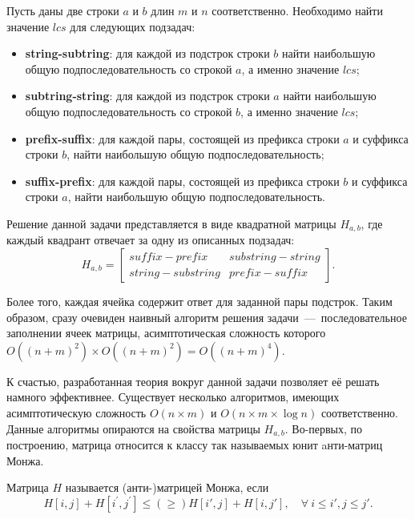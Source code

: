 \begin{definition}
Пусть даны две строки $a$ и $b$ длин $m$ и $n$ соответственно. 
Необходимо найти значение $lcs$ для следующих подзадач:
\begin{itemize}
\item \textbf{string-subtring}: для каждой из подстрок строки $b$ найти наибольшую общую подпоследовательность со строкой $a$, а именно значение $lcs$;
\item \textbf{subtring-string}: для каждой из подстрок строки $a$ найти наибольшую общую подпоследовательность со строкой $b$, а именно значение $lcs$;
\item \textbf{prefix-suffix}: для каждой пары, состоящей из префикса строки $a$ и суффикса строки $b$, найти наибольшую общую подпоследовательность;
\item \textbf{suffix-prefix}: для каждой пары, состоящей из префикса строки $b$ и суффикса строки $a$, найти наибольшую общую подпоследовательность.
\end{itemize}
\end{definition}

Решение данной задачи представляется в виде квадратной матрицы $H_{a,b}$, где каждый квадрант отвечает за одну из описанных подзадач: 
\begin{equation}
H_{a,b} = \begin{bmatrix}
  suffix-prefix & substring-string \\
  string-substring & prefix-suffix
  \end{bmatrix}.
\end{equation}

Более того, каждая ячейка содержит ответ для заданной пары подстрок.
Таким образом, сразу очевиден наивный алгоритм решения задачи~---~последовательное заполнении ячеек матрицы, асимптотическая сложность которого $O((n+m)^2) \times O((n+m)^2) = O((n+ m)^4)$.

К счастью, разработанная теория вокруг данной задачи позволяет её решать намного эффективнее.
Существует несколько алгоритмов, имеющих асимптотическую сложность $O(n \times m)$ и $O(n \times m \times \log n)$ соответственно.
Данные алгоритмы опираются на свойства матрицы $H_{a,b}$. %
Во-первых, по построению, матрица относится к классу так называемых юнит aнти-матриц Монжа.
\begin{definition}
Матрица $H$ называется (анти-)матрицей Монжа, если %
\begin{equation}
  H[i, j] + H[i^{'},j^{'}] \leq(\geq) H[i', j] + H[i,j'] ,\quad \forall \: i \leq i' , j \leq j'.
\end{equation}
\end{definition}


